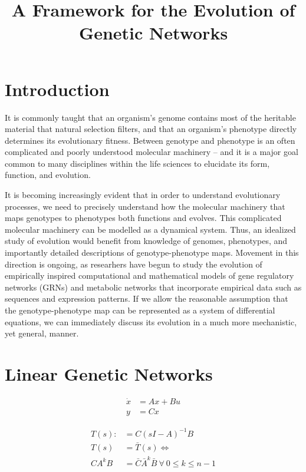 \documentclass[a4paper, 11 pt]{article}
\begin{document}
  \title{A Framework for the Evolution of Genetic Networks}
  \section{Introduction}

    It is commonly taught that an organism's genome contains most of the heritable material that natural selection filters, and that an organism's phenotype directly determines its evolutionary fitness. Between genotype and phenotype is an often complicated and poorly understood molecular machinery -- and it is a major goal common to many disciplines within the life sciences to elucidate its form, function, and evolution. 


    It is becoming increasingly evident that in order to understand evolutionary processes, we need to precisely understand how the molecular machinery that maps genotypes to phenotypes both functions and evolves. This complicated molecular machinery can be modelled as a dynamical system. Thus, an idealized study of evolution would benefit from knowledge of genomes, phenotypes, and importantly detailed descriptions of genotype-phenotype maps. Movement in this direction is ongoing, as researhers have begun to study the evolution of empirically inspired computational and mathematical models of gene regulatory networks (GRNs) and metabolic networks that incorporate empirical data such as sequences and expression patterns. If we allow the reasonable assumption that the genotype-phenotype map can be represented as a system of differential equations, we can immediately discuss its evolution in a much more mechanistic, yet general, manner. 

  \section{Linear Genetic Networks}
    \begin{equation}
      \begin{split}
        \dot{x} &= A x + B u \\
        y &= C x
      \end{split}
    \end{equation}

    \begin{equation}
      \begin{split}
        T(s) :&= C (sI - A)^{-1} B \\
        T(s) &= \bar{T}(s) \iff \\ 
        CA^{k}B &= \bar{C} \bar{A}^{k} \bar{B} \ \forall \ 0 \leq k \leq n-1
      \end{split}
    \end{equation}
\end{document}

